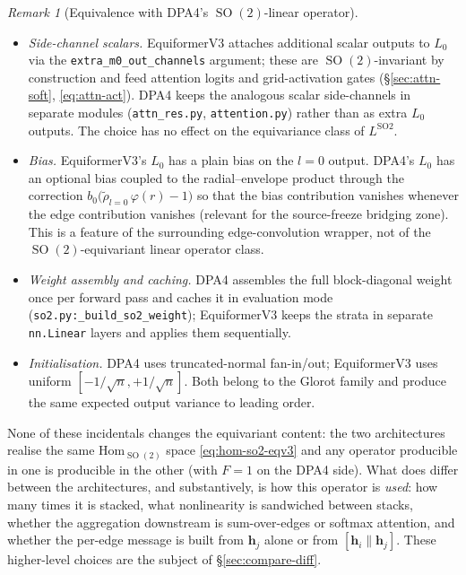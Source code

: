 \documentclass[11pt,a4paper]{article}
\DeclareMathOperator{\SO}{SO}
\newcommand{\bh}{\bm{h}}
\theoremstyle{plain}
\theoremstyle{definition}
\theoremstyle{remark}
\newtheorem{remark}[theorem]{Remark}
\begin{document}
\begin{remark}[Equivalence with DPA4's $\SO(2)$-linear operator]
\begin{itemize}[leftmargin=2em]
        \item \emph{Side-channel scalars.}
              EquiformerV3 attaches additional scalar outputs to $L_0$ via the \texttt{extra\_m0\_out\_channels} argument; these are $\SO(2)$-invariant by construction and feed attention logits and grid-activation gates (\S\ref{sec:attn-soft}, \eqref{eq:attn-act}).
              DPA4 keeps the analogous scalar side-channels in separate modules (\texttt{attn\_res.py}, \texttt{attention.py}) rather than as extra $L_0$ outputs.
              The choice has no effect on the equivariance class of $L^{\mathrm{SO2}}$.
        \item \emph{Bias.}
              EquiformerV3's $L_0$ has a plain bias on the $l=0$ output.
              DPA4's $L_0$ has an optional bias coupled to the radial--envelope product through the correction $b_0\bigl(\widetilde\rho_{l=0}\,\varphi(r)-1\bigr)$ so that the bias contribution vanishes whenever the edge contribution vanishes (relevant for the source-freeze bridging zone).
              This is a feature of the surrounding edge-convolution wrapper, not of the $\SO(2)$-equivariant linear operator class.
        \item \emph{Weight assembly and caching.}
              DPA4 assembles the full block-diagonal weight once per forward pass and caches it in evaluation mode (\texttt{so2.py:\_build\_so2\_weight}); EquiformerV3 keeps the strata in separate \texttt{nn.Linear} layers and applies them sequentially.
        \item \emph{Initialisation.}
              DPA4 uses truncated-normal fan-in/out; EquiformerV3 uses uniform $[-1/\sqrt{n},+1/\sqrt{n}]$.
              Both belong to the Glorot family and produce the same expected output variance to leading order.
    \end{itemize}
    None of these incidentals changes the equivariant content: the two architectures realise the same $\mathrm{Hom}_{\SO(2)}$ space \eqref{eq:hom-so2-eqv3} and any operator producible in one is producible in the other (with $F=1$ on the DPA4 side).
    What does differ between the architectures, and substantively, is how this operator is \emph{used}: how many times it is stacked, what nonlinearity is sandwiched between stacks, whether the aggregation downstream is sum-over-edges or softmax attention, and whether the per-edge message is built from $\bh_j$ alone or from $[\bh_i\|\bh_j]$.
    These higher-level choices are the subject of \S\ref{sec:compare-diff}.
\end{remark}
\end{document}
